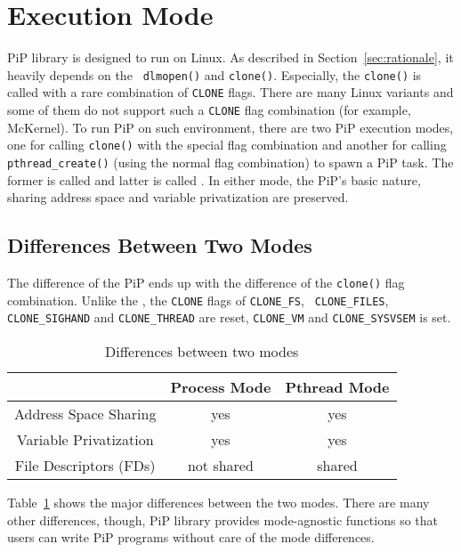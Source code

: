 
\section{Execution Mode}\label{sec:exec-mode}

PiP library is designed to run on Linux. As described in
Section~\ref{sec:rationale}, it heavily depends on the {\tt
  dlmopen()} and {\tt clone()}. Especially, the {\tt clone()} is
called with a rare combination of {\tt CLONE} flags. There are many
Linux variants and some of them do not support such a {\tt CLONE} 
flag combination (for example, McKernel). To run PiP on
such environment, there are two PiP 
execution modes, one for calling {\tt clone()} with the special flag
combination and another for calling {\tt pthread_create()} (using the
normal flag combination) to spawn a PiP task. The former is called
 and latter is called . In
either mode, the PiP's basic nature, sharing address space and
variable privatization are preserved. 

\subsection{Differences Between Two Modes}

The difference of the PiP  ends up with the
difference of the {\tt clone()} flag combination. Unlike the
, the {\tt CLONE} flags of {\tt CLONE_FS}, {\tt
  CLONE_FILES}, {\tt CLONE_SIGHAND} and {\tt CLONE_THREAD} are reset,
{\tt CLONE_VM} and {\tt CLONE_SYSVSEM} is set. 

\begin{table}[ht]
  \centering
  \caption{Differences between two modes}\label{tbl:mode-diff}
  \vspace{3mm}
  \begin{tabular}{c||c|c}
    \hline
    & Process Mode & Pthread Mode \\
    \hline
    \hline
    Address Space Sharing & yes & yes \\
    Variable Privatization & yes & yes \\
    File Descriptors (FDs) & not shared & shared \\
    \hline
  \end{tabular}
\end{table}

Table~\ref{tbl:mode-diff} shows the major differences between the two
modes. There are many other differences, though, PiP library provides
mode-agnostic functions so that users can write PiP programs without
care of the mode differences. 

